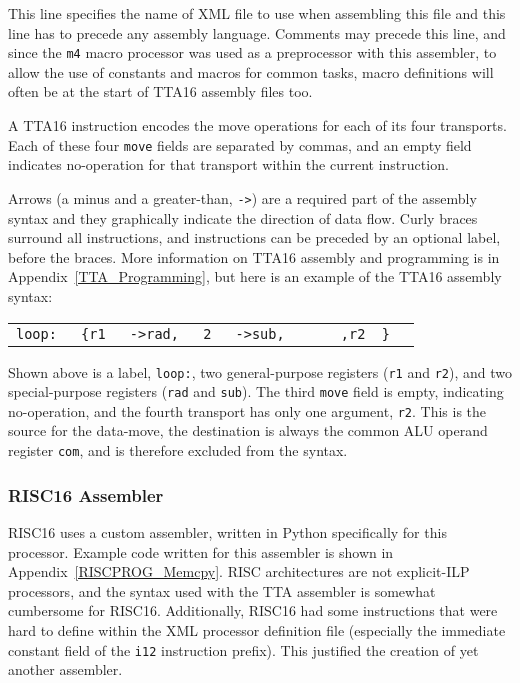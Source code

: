 This line specifies the name of XML file to use when assembling this file and
this line has to precede any assembly language. Comments may precede this line,
and since the \texttt{m4} macro processor was used as a preprocessor with this
assembler, to allow the use of constants and macros for common tasks, macro
definitions will often be at the start of TTA16 assembly files too.

A TTA16 instruction encodes the move operations for each of its four transports.
Each of these four \texttt{move} fields are separated by commas, and an empty
field indicates no-operation for that transport within the current instruction.

Arrows (a minus and a greater-than, \texttt{->}) are a required part of the
assembly syntax and they graphically indicate the direction of data flow. Curly
braces surround all instructions, and instructions can be preceded by an optional
label, before the braces. More information on TTA16 assembly and programming is
in Appendix~\ref{TTA_Programming}, but here is an example of the TTA16 assembly
syntax:
\begin{center}
\begin{tabular}{l l l l l l l l l}
\tt loop: & \tt \{r1 & \tt ->rad, & \tt 2 & \tt ->sub, & & & \tt ,r2 \tt
\}
\end{tabular}
\end{center}
Shown above is a label, \texttt{loop:}, two general-purpose registers
(\texttt{r1} and \texttt{r2}), and two special-purpose registers
(\texttt{rad} and \texttt{sub}). The third \texttt{move} field is empty,
indicating no-operation, and the fourth transport has only one argument,
\texttt{r2}. This is the source for the data-move, the destination is always the
common ALU operand register \texttt{com}, and is therefore excluded from the
syntax.


\subsubsection{RISC16 Assembler}


RISC16 uses a custom assembler, written in Python specifically for this
processor. Example code written for this assembler is shown in
Appendix~\ref{RISCPROG_Memcpy}. RISC architectures are not explicit-ILP
processors, and the syntax used with the TTA assembler is somewhat cumbersome for
RISC16. Additionally, RISC16 had some instructions that were hard to define
within the XML processor definition file (especially the immediate constant field
of the \texttt{i12} instruction prefix). This justified the creation of yet
another assembler.

